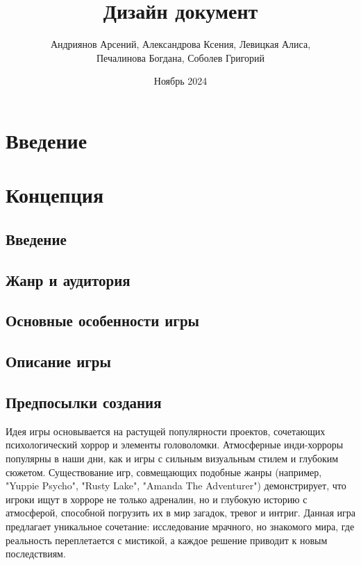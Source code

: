 \documentclass{article}
\title{Дизайн документ}
\author{Андриянов Арсений, Александрова Ксения, Левицкая Алиса, \\ Печалинова Богдана, Соболев Григорий}
\date{Ноябрь 2024}
\begin{document}
	
	\maketitle
	
	\tableofcontents
	
	\newpage
	\section{Введение}
	
	\newpage
	\section{Концепция}
	
	\subsection{Введение}
	
	\newpage
	\subsection{Жанр и аудитория}
	
	\newpage
	\subsection{Основные особенности игры}
	
	\newpage
	\subsection{Описание игры}
	
	\newpage
	\subsection{Предпосылки создания}
	
	Идея игры основывается на растущей популярности проектов, сочетающих психологический хоррор и элементы головоломки. Атмосферные инди-хорроры популярны в наши дни, как и игры с сильным визуальным стилем и глубоким сюжетом. Существование игр, совмещающих подобные жанры (например, "Yuppie Psycho", "Rusty Lake", "Amanda The Adventurer") демонстрирует, что игроки ищут в хорроре не только адреналин, но и глубокую историю с атмосферой, способной погрузить их в мир загадок, тревог и интриг. Данная игра предлагает уникальное сочетание: исследование мрачного, но знакомого мира, где реальность переплетается с мистикой, а каждое решение приводит к новым последствиям. \\
	
\end{document}

